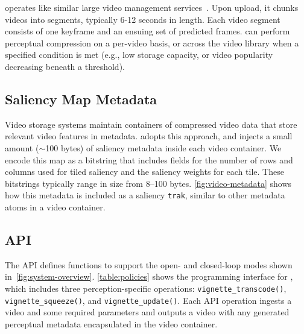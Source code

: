 \nameStore operates like similar large video management services~\cite{vbench, huang2017sve, netflix2018shotbased}.
Upon upload, it chunks videos into segments, typically 6-12 seconds in length.
Each video segment consists of one keyframe and an ensuing set of predicted frames.
\nameStore can perform perceptual compression on a per-video basis, or across the video library when a specified condition is met (e.g., low storage capacity, or video popularity decreasing beneath a threshold).

\subsection{Saliency Map Metadata}
\label{sec:system:metadata}

Video storage systems maintain containers of compressed video data that store relevant video features in metadata.
\nameStore adopts this approach, and injects a small amount ($\sim$100 bytes) of saliency metadata inside each video container.
We encode this map as a bitstring that includes fields for the number of rows and columns used for tiled saliency and the saliency weights for each tile.
These bitstrings typically range in size from 8--100 bytes.
\ref{fig:video-metadata} shows how this metadata is included as a saliency \texttt{trak}, similar to other metadata atoms in a video container.

\videoMetadataFigure

\subsection{\nameStore API}
\label{sec:system:interface}


The \nameStore API defines functions to support the open- and closed-loop modes shown in~\ref{fig:system-overview}.
\ref{table:policies} shows the programming interface for \name, which includes three perception-specific operations: \texttt{vignette\_transcode()}, \texttt{vignette\_squeeze()}, and \texttt{vignette\_update()}.
Each API operation ingests a video and some required parameters and outputs a video with any generated perceptual metadata encapsulated in the video container.

